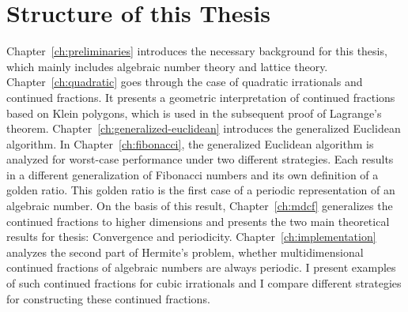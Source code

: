 \section{Structure of this Thesis}
\label{sec:structure}

Chapter~\ref{ch:preliminaries} introduces the necessary background for this thesis,
which mainly includes algebraic number theory and lattice theory.
Chapter~\ref{ch:quadratic} goes through the case of quadratic irrationals and continued fractions.
It presents a geometric interpretation of continued fractions based on Klein polygons,
which is used in the subsequent proof of Lagrange's theorem.
Chapter~\ref{ch:generalized-euclidean} introduces the generalized Euclidean algorithm.
In Chapter~\ref{ch:fibonacci}, the generalized Euclidean algorithm is analyzed
for worst-case performance under two different strategies.
Each results in a different generalization of Fibonacci numbers and its own definition of a golden ratio.
This golden ratio is the first case of a periodic representation of an algebraic number.
On the basis of this result, Chapter~\ref{ch:mdcf} generalizes the continued fractions to higher dimensions
and presents the two main theoretical results for thesis: Convergence and periodicity.
Chapter~\ref{ch:implementation} analyzes the second part of Hermite's problem,
whether multidimensional continued fractions of algebraic numbers are always periodic.
I present examples of such continued fractions for cubic irrationals and I
compare different strategies for constructing these continued fractions.
